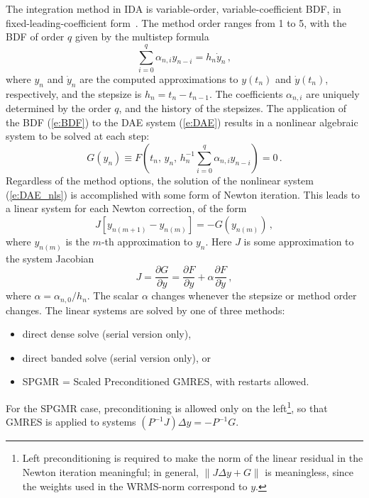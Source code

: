 The integration method in IDA is variable-order, variable-coefficient
BDF, in fixed-leading-coefficient form~\cite{BCP:96}.
The method order ranges from 1 to 5, with the BDF of order $q$
given by the multistep formula
\begin{equation}\label{e:BDF}
  \sum_{i=0}^q \alpha_{n,i}y_{n-i} = h_n {\dot y}_n \, ,
\end{equation}
where $y_n$ and ${\dot y}_n$ are the computed approximations to $y(t_n)$
and ${\dot y}(t_n)$, respectively, and the stepsize is $h_n = t_n - t_{n-1}$.  
The coefficients $\alpha_{n,i}$ are uniquely determined by the order
$q$, and the history of the stepsizes.  The application of the BDF
(\ref{e:BDF}) to the DAE system (\ref{e:DAE}) results in a nonlinear
algebraic system to be solved at each step:
\begin{equation}\label{e:DAE_nls}
  G(y_n) \equiv 
  F \left( t_n , \, y_n , \, 
    h_n^{-1} \sum_{i=0}^q \alpha_{n,i}y_{n-i} \right) = 0 \, .
\end{equation}
%
Regardless of the method options, the solution of the nonlinear system
(\ref{e:DAE_nls}) is accomplished with some form of Newton iteration.
This leads to a linear system for each Newton correction, of the form
\begin{equation}\label{e:DAE_Newtoncorr}
  J [y_{n(m+1)} - y_{n(m)}] = -G(y_{n(m)})  \, , 
\end{equation}
where $y_{n(m)}$ is the $m$-th approximation to $y_n$. 
%
Here $J$ is some approximation to the system Jacobian
\begin{equation}\label{e:DAE_Jacobian}
  J = \frac{\partial G}{\partial y}
  = \frac{\partial F}{\partial y} + 
  \alpha\frac{\partial F}{\partial {\dot y}} \, ,
\end{equation}
where $\alpha = \alpha_{n,0}/h_n$.  The scalar $\alpha$ changes 
whenever the stepsize or method order changes.
%
The linear systems are solved by one of three methods:
\begin{itemize}
\item direct dense solve (serial version only),
\item direct banded solve (serial version only), or
\item SPGMR = Scaled Preconditioned GMRES, with restarts allowed.
\end{itemize}
For the SPGMR case, preconditioning is allowed only on the
left\footnote{Left preconditioning is required to make the norm of
the linear residual in the Newton iteration meaningful; in general,
$\| J \Delta y + G \|$ is meaningless, since the weights used in 
the WRMS-norm correspond to $y$.}, 
so that GMRES is applied to systems $(P^{-1}J)\Delta y = -P^{-1}G$. 

